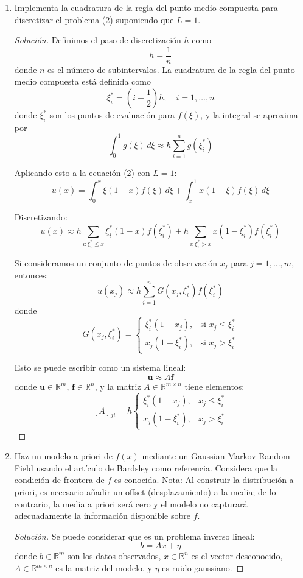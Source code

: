 \documentclass[12pt,spanish,mexico]{article}
\numberwithin{equation}{section}
\theoremstyle{definition}
\theoremstyle{remark}
\newenvironment{solution}{\begin{proof}[Solución]}{\end{proof}}
\begin{document}
\begin{enumerate}
\item Implementa la cuadratura de la regla del punto medio compuesta para discretizar el problema (2) suponiendo que $L = 1$.

\begin{solution}
Definimos el paso de discretización $h$ como 
\[
h = \frac{1}{n}
\]
donde $n$ es el número de subintervalos. La cuadratura de la regla del punto medio compuesta está definida como
\[
\xi_i^* = \left(i - \frac{1}{2}\right)h, \quad i = 1, \dots, n
\]
donde $\xi_i^*$ son los puntos de evaluación para $f(\xi)$, y la integral se aproxima por
\[
\int_{0}^{1} g(\xi)\,d\xi \approx h\sum_{i=1}^{n} g(\xi_i^*)
\]

Aplicando esto a la ecuación (2) con $L=1$:
\[
u(x) = \int_{0}^{x} \xi(1-x) f(\xi) \, d\xi + \int_{x}^{1} x(1-\xi) f(\xi) \, d\xi
\]

Discretizando:
\[
u(x) \approx h \sum_{i: \xi_i^* \le x} \xi_i^*(1-x) f(\xi_i^*) + h \sum_{i: \xi_i^* > x} x(1-\xi_i^*) f(\xi_i^*)
\]

Si consideramos un conjunto de puntos de observación $x_j$ para $j = 1, \dots, m$, entonces:
\[
u(x_j) \approx h \sum_{i=1}^{n} G(x_j, \xi_i^*) f(\xi_i^*)
\]
donde
\[
G(x_j, \xi_i^*) = \begin{cases}
\xi_i^*(1-x_j), & \text{si } x_j \le \xi_i^* \\
x_j(1-\xi_i^*), & \text{si } x_j > \xi_i^*
\end{cases}
\]

Esto se puede escribir como un sistema lineal:
\[
\mathbf{u} \approx A \mathbf{f}
\]
donde $\mathbf{u} \in \mathbb{R}^m$, $\mathbf{f} \in \mathbb{R}^n$, y la matriz $A \in \mathbb{R}^{m \times n}$ tiene elementos:
\[
\left[A\right]_{ji} = h \begin{cases}
\xi_i^*(1-x_j), & x_j \le \xi_i^* \\
x_j(1-\xi_i^*), & x_j > \xi_i^*
\end{cases}
\]
\end{solution}
\item Haz un modelo a priori de $f(x)$ mediante un Gaussian Markov Random Field usando el artículo de Bardsley como referencia. Considera que la condición de frontera de $f$ es conocida. Nota: Al construir la distribución a priori, es necesario añadir un offset (desplazamiento) a la media; de lo contrario, la media a priori será cero y el modelo no capturará adecuadamente la información disponible sobre $f$.

\begin{solution}
Se puede considerar que es un problema inverso lineal:
\[
b = Ax + \eta
\]
donde $b \in \mathbb{R}^m$ son los datos observados, $x \in \mathbb{R}^n$ es el vector desconocido, $A \in \mathbb{R}^{m \times n}$ es la matriz del modelo, y $\eta$ es ruido gaussiano.


\end{solution}
\end{enumerate}
\end{document}
